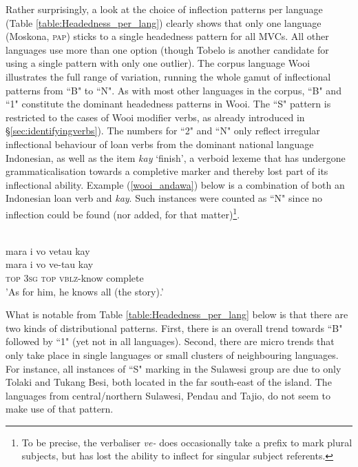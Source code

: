 Rather surprisingly, a look at the choice of inflection patterns per language (Table \ref{table:Headedness_per_lang}) clearly shows that only one language (Moskona, \textsc{pap}) sticks to a single headedness pattern for all MVCs. All other languages use more than one option (though Tobelo is another candidate for using a single pattern with only one outlier). The corpus language Wooi illustrates the full range of variation, running the whole gamut of inflectional patterns from ``B" to ``N". As with most other languages in the corpus, ``B" and ``1" constitute the dominant headedness patterns in Wooi. The ``S" pattern is restricted to the cases of Wooi modifier verbs, as already introduced in §\ref{sec:identifyingverbs}). The numbers for ``2" and ``N" only reflect irregular inflectional behaviour of loan verbs from the dominant national language Indonesian, as well as the item \textit{kay} `finish', a verboid lexeme that has undergone grammaticalisation towards a completive marker and thereby lost part of its inflectional ability. Example (\ref{wooi_andawa}) below is a combination of both an Indonesian loan verb and \textit{kay}. Such instances were counted as ``N" since no inflection could be found (nor added, for that matter)\footnote{To be precise, the verbaliser \textit{ve-} does occasionally take a prefix to mark plural subjects, but has lost the ability to inflect for singular subject referents.}.

\ea \label{wooi_andawa}
\\
\glll mara i vo vetau kay \\
mara i vo ve-tau kay \\
\textsc{top} \textsc{3}\textsc{sg} \textsc{top} \textsc{vblz}-know complete \\
\glft 'As for him, he knows all (the story).' \\ 
\z

What is notable from Table \ref{table:Headedness_per_lang} below is that there are two kinds of distributional patterns. First, there is an overall trend towards ``B" followed by ``1" (yet not in all languages). Second, there are micro trends that only take place in single languages or small clusters of neighbouring languages. For instance, all instances of ``S" marking in the Sulawesi group are due to only Tolaki and Tukang Besi, both located in the far south-east of the island. The languages from central/northern Sulawesi, Pendau and Tajio, do not seem to make use of that pattern. 

